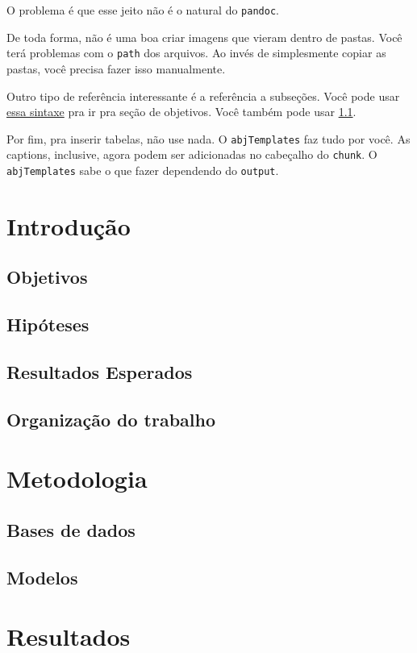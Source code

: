 \documentclass[12pt,]{report}
\begin{document}
O problema é que esse jeito não é o natural do \texttt{pandoc}.

De toda forma, não é uma boa criar imagens que vieram dentro de pastas.
Você terá problemas com o \texttt{path} dos arquivos. Ao invés de
simplesmente copiar as pastas, você precisa fazer isso manualmente.

Outro tipo de referência interessante é a referência a subseções. Você
pode usar \protect\hyperlink{objetivos}{essa sintaxe} pra ir pra seção
de objetivos. Você também pode usar \ref{objetivos}.

Por fim, pra inserir tabelas, não use nada. O \texttt{abjTemplates} faz
tudo por você. As captions, inclusive, agora podem ser adicionadas no
cabeçalho do \texttt{chunk}. O \texttt{abjTemplates} sabe o que fazer
dependendo do \texttt{output}.

\chapter{Introdução}\label{introducao}

\hypertarget{objetivos}{\section{Objetivos}\label{objetivos}}

\section{Hipóteses}\label{hipoteses}

\section{Resultados Esperados}\label{resultados-esperados}

\section{Organização do trabalho}\label{organizacao-do-trabalho}

\chapter{Metodologia}\label{metodologia}

\section{Bases de dados}\label{bases-de-dados}

\section{Modelos}\label{modelos}

\chapter{Resultados}\label{resultados}


\end{document}
